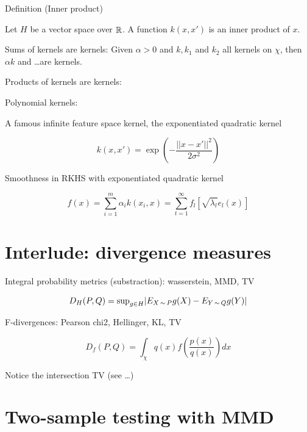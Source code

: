 \documentclass[b5paper]{report}
\begin{document}
Definition (Inner product)

Let $H$ be a vector space over $\operatorname*{\mathbb{\mathop{R}}}$. A function $k(x,x')$ is an inner
product of $x$.

\begin{theorem}
  Sums of kernels are kernels: Given $\alpha > 0$ and $k, k_1$ and $k_2$ all
  kernels on $\chi$, then $\alpha k$ and \dots are kernels.
\end{theorem}

\begin{theorem}
  Products of kernels are kernels:
\end{theorem}

\begin{theorem}
  Polynomial kernels:
\end{theorem}

A famous infinite feature space kernel, the exponentiated quadratic kernel

\begin{equation}
  k(x, x') = \exp\left(-\frac{||x-x'||^2}{2\sigma^2}\right)
\end{equation}

Smoothness in RKHS with exponentiated quadratic kernel

\begin{equation}
  f(x) = \sum_{i=1}^m \alpha_i k(x_i, x) = \sum_{t=1}^\infty f_l [\sqrt{\lambda_l}e_l(x)]
\end{equation}

\section{Interlude: divergence measures}

Integral probability metrics (substraction): wasserstein, MMD, TV

\begin{equation}
  D_H(P,Q) = \text{sup}_{g \in H} | E_{X \operatorname*{\sim} P}g(X) - E_{Y \operatorname*{\sim} Q}g(Y)|
\end{equation}

F-divergences: Pearson chi2, Hellinger, KL, TV

\begin{equation}
  D_f(P,Q) = \int_\chi q(x) f(\frac{p(x)}{q(x)})dx
\end{equation}

Notice the intersection TV (see \dots)

\section{Two-sample testing with MMD}
\end{document}
